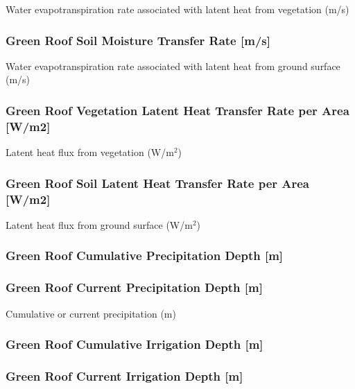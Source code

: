 Water evapotranspiration rate associated with latent heat from vegetation (m/s)

\subsubsection{Green Roof Soil Moisture Transfer Rate {[}m/s{]}}\label{green-roof-soil-moisture-transfer-rate-ms}

Water evapotranspiration rate associated with latent heat from ground surface (m/s)

\subsubsection{Green Roof Vegetation Latent Heat Transfer Rate per Area {[}W/m2{]}}\label{green-roof-vegetation-latent-heat-transfer-rate-per-area-wm2}

Latent heat flux from vegetation (W/m\(^{2}\))

\subsubsection{Green Roof Soil Latent Heat Transfer Rate per Area {[}W/m2{]}}\label{green-roof-soil-latent-heat-transfer-rate-per-area-wm2}

Latent heat flux from ground surface (W/m\(^{2}\))

\subsubsection{Green Roof Cumulative Precipitation Depth {[}m{]}}\label{green-roof-cumulative-precipitation-depth-m}

\subsubsection{Green Roof Current Precipitation Depth {[}m{]}}\label{green-roof-current-precipitation-depth-m}

Cumulative or current precipitation (m)

\subsubsection{Green Roof Cumulative Irrigation Depth {[}m{]}}\label{green-roof-cumulative-irrigation-depth-m}

\subsubsection{Green Roof Current Irrigation Depth {[}m{]}}\label{green-roof-current-irrigation-depth-m}


